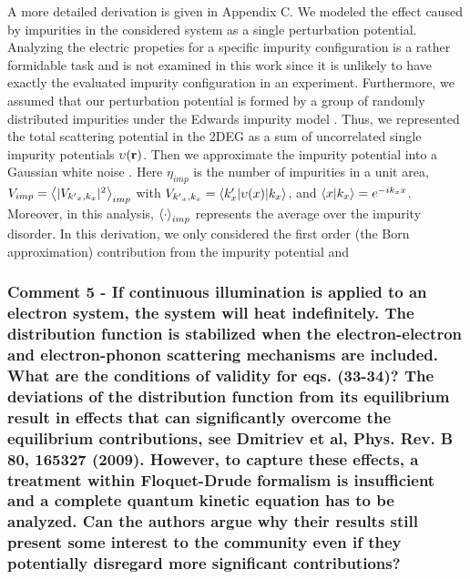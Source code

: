 \documentclass{article}
\begin{document}
\begin{itemize}
{  A more detailed derivation is given in Appendix C.
  We modeled the effect caused by impurities in the considered system as a single perturbation potential. Analyzing the electric propeties for a specific impurity configuration is a rather formidable task and is not examined in this work since it is unlikely to have exactly the evaluated impurity configuration in an experiment.
  Furthermore, we assumed that our perturbation potential is formed by a group of randomly distributed impurities under the Edwards impurity model \cite{akkermans10,wackerl20}.
  Thus, we represented the total scattering potential in the 2DEG as a sum of uncorrelated single impurity potentials $\upsilon(\vb{r})$. Then we  approximate the impurity potential into a Gaussian white noise \cite{akkermans10,wackerl20}.
  Here $\eta_{imp}$ is the number of impurities in a unit area, $V_{imp} = \expval{|V_{{k'}_x,k_x}|^2}_{imp}$ with $V_{{k'}_x,k_x} = \mel**{k'_x}{\upsilon(x) }{k_x}$, and $\braket{x}{k_x} = e^{-ik_x x}$.
  Moreover, in this analysis, $\expval{\cdot}_{imp}$ represents the average over the impurity disorder. In this derivation, we only considered the first order (the Born approximation) contribution from the impurity potential and
  }
\end{itemize}

\subsubsection*{Comment 5 -
\color{RoyalBlue} If continuous illumination is applied to an electron system, the system will heat indefinitely. The distribution function is stabilized when the electron-electron and electron-phonon scattering mechanisms are included. What are the conditions of validity for eqs. (33-34)? The deviations of the distribution function from its equilibrium result in effects that can significantly overcome the equilibrium contributions, see Dmitriev et al, Phys. Rev. B 80, 165327 (2009). However, to capture these effects, a treatment within Floquet-Drude formalism is insufficient and a complete quantum kinetic equation has to be analyzed. Can the authors argue why their results still present some interest to the community even if they potentially disregard more significant contributions?
}
\end{document}
